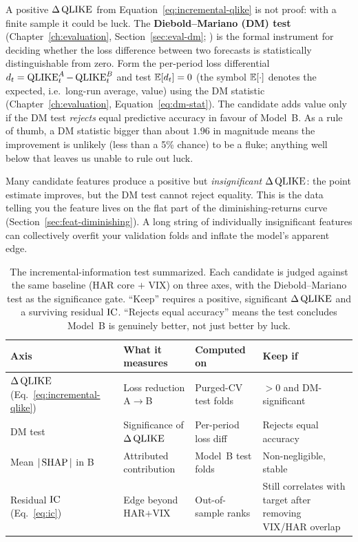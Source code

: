 A positive $\Delta\operatorname{QLIKE}$ from Equation~\ref{eq:incremental-qlike} is not proof: with a finite sample it could be luck. The \textbf{Diebold--Mariano (DM) test} (Chapter~\ref{ch:evaluation}, Section~\ref{sec:eval-dm}; \citealp{DieboldMariano1995}) is the formal instrument for deciding whether the loss difference between two forecasts is statistically distinguishable from zero. Form the per-period loss differential $d_t = \operatorname{QLIKE}_t^A - \operatorname{QLIKE}_t^B$ and test $\mathbb{E}[d_t] = 0$ (the symbol $\mathbb{E}[\cdot]$ denotes the expected, i.e.\ long-run average, value) using the DM statistic (Chapter~\ref{ch:evaluation}, Equation~\ref{eq:dm-stat}). The candidate adds value only if the DM test \emph{rejects} equal predictive accuracy in favour of Model~B. As a rule of thumb, a DM statistic bigger than about $1.96$ in magnitude means the improvement is unlikely (less than a 5\% chance) to be a fluke; anything well below that leaves us unable to rule out luck.

\begin{warning}
Many candidate features produce a positive but \emph{insignificant} $\Delta\operatorname{QLIKE}$: the point estimate improves, but the DM test cannot reject equality. This is the data telling you the feature lives on the flat part of the diminishing-returns curve (Section~\ref{sec:feat-diminishing}). A long string of individually insignificant features can collectively overfit your validation folds and inflate the model's apparent edge.
\end{warning}

\begin{table}[ht]
\centering
\caption{The incremental-information test summarized. Each candidate is judged against the same baseline (HAR core $+$ VIX) on three axes, with the Diebold--Mariano test as the significance gate. ``Keep'' requires a positive, significant $\Delta\operatorname{QLIKE}$ and a surviving residual $\operatorname{IC}$. ``Rejects equal accuracy'' means the test concludes Model~B is genuinely better, not just better by luck.}
\label{tab:incremental-test}
\small
\begin{tabular}{@{}llll@{}}
\toprule
\textbf{Axis} & \textbf{What it measures} & \textbf{Computed on} & \textbf{Keep if} \\
\midrule
$\Delta\operatorname{QLIKE}$ (Eq.~\ref{eq:incremental-qlike}) & Loss reduction A$\to$B & Purged-CV test folds & $> 0$ and DM-significant \\
DM test & Significance of $\Delta\operatorname{QLIKE}$ & Per-period loss diff & Rejects equal accuracy \\
Mean $|\operatorname{SHAP}|$ in B & Attributed contribution & Model~B test folds & Non-negligible, stable \\
Residual $\operatorname{IC}$ (Eq.~\ref{eq:ic}) & Edge beyond HAR$+$VIX & Out-of-sample ranks & Still correlates with target after removing VIX/HAR overlap \\
\bottomrule
\end{tabular}
\end{table}

